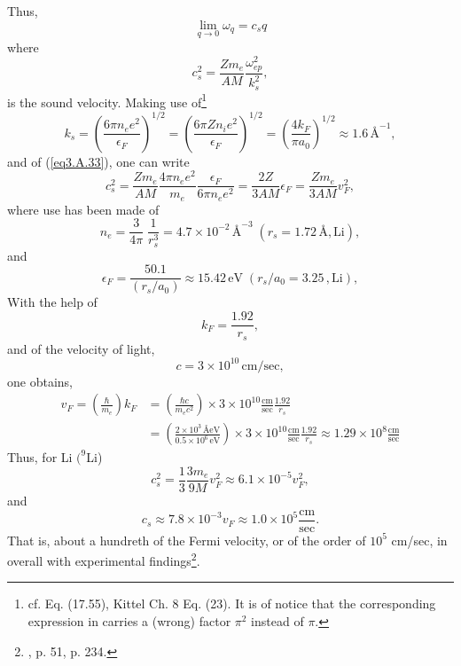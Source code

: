 \begin{subappendices}
Thus,
\begin{equation}\label{eqC2AppA4}
\lim_{q\rightarrow 0}\omega_q=c_sq
\end{equation}
where
\begin{equation}\label{eqC2AppA5}
c^2_s=\frac{Zm_e}{AM}\frac{\omega_{ep}^2}{k_s^2},
\end{equation}
is the sound velocity. Making use of\footnote{cf. \cite{Ashcroft:87} Eq. (17.55), Kittel Ch. 8 Eq. (23). It is of notice that the corresponding expression in \cite{Ketterson:99} carries a (wrong) factor $\pi^2$ instead of $\pi$.}
\begin{equation}\label{eqC2AppA6}
k_s=\left(\frac{6\pi n_e e^2}{\epsilon_F}\right)^{1/2}=\left(\frac{6\pi Z n_i e^2}{\epsilon_F}\right)^{1/2}=\left(\frac{4k_F}{\pi a_0}\right)^{1/2}\approx 1.6\,\text{\AA}^{-1},
\end{equation}
and of (\ref{eq3.A.33}),
one can write
\begin{equation}\label{eqC2AppA8}
c_s^2=\frac{Zm_e}{AM}\frac{4\pi n_ee^2}{m_e}\frac{\epsilon_F}{6\pi n_e e^2}=\frac{2Z}{3 AM}\epsilon_F=\frac{Zm_e}{3 AM}v_F^2,
\end{equation}
where use has been made of
\begin{equation}\label{eqC2AppA56}
n_e=\frac{3}{4\pi}\;\frac{1}{r_s^3}=4.7\times10^{-2}\,\text{\AA}^{-3}\;(r_s=1.72\,\text{\AA},\text{Li}),
\end{equation}
and
\begin{equation}\label{eqC2AppA57}
\epsilon_F=\frac{50.1}{(r_s/a_0)}\approx 15.42\,\text{eV}\;(r_s/a_0=3.25\,,\text{Li}),
\end{equation}
With the help of
\begin{equation}\label{eqC2AppA9}
k_F=\frac{1.92}{r_s},
\end{equation}
and of the velocity of light,
\begin{equation}\label{eqC2AppA10}
c=3\times 10^{10}\,\text{cm/sec},
\end{equation}
one obtains,
\begin{align}\label{eqC2AppA11}
\nonumber v_F=\left(\frac{\hbar}{m_e}\right)k_F&
=\left(\frac{\hbar c}{m_e c^2}\right)\times 3\times 10^{10}\frac{\text{cm}}{\text{sec}}\frac{1.92}{r_s}\\
&=\left(\frac{2\times 10^3\,\text{\AA eV}}{0.5\times 10^6\,\text{eV}}\right)\times 3\times 10^{10}\frac{\text{cm}}{\text{sec}}\frac{1.92}{r_s}
\approx 1.29\times 10^8 \frac{\text{cm}}{\text{sec}}
\end{align}
Thus, for Li $(^9$Li) 
\begin{equation}\label{eqC2AppA12}
c_s^2=\frac{1}{3}\frac{3m_e}{9M}v_F^2\approx 6.1\times 10^{-5}v_F^2,
\end{equation}
and
\begin{equation}\label{eqC2AppA13}
c_s\approx 7.8\times 10^{-3}v_F\approx 1.0\times 10^5 \frac{\text{cm}}{\text{sec}}.
\end{equation}
That is, about a hundreth of the Fermi velocity, or of the order of $10^5$ cm/sec, in overall  with  experimental findings\footnote{\cite{Ashcroft:87}, p. 51, \cite{Ketterson:99} p. 234.}.




\end{subappendices}
